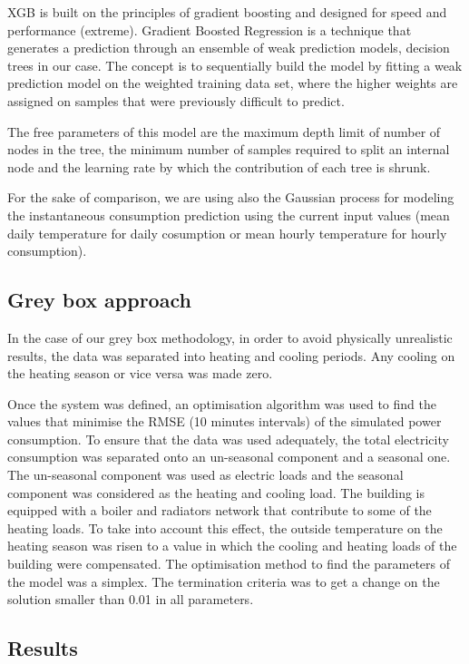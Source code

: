 \documentclass[10pt, conference, compsocconf]{IEEEtran}
\begin{document}
XGB is built on the principles of gradient boosting and designed for speed and performance (extreme).
Gradient Boosted Regression is a technique that generates a prediction through an ensemble of weak prediction models, decision trees in our case. The concept is to sequentially build the model by fitting a weak prediction model on the weighted training data set, where the higher weights are assigned on samples that were previously difficult to predict.

The free parameters of this model are the maximum depth limit of number of nodes in the tree, the minimum number of samples required to split an internal node and the learning rate by which the contribution of each tree is shrunk.

For the sake of comparison, we are using also the Gaussian process for modeling the instantaneous consumption prediction using the current input values (mean daily temperature for daily cosumption or mean hourly temperature for hourly consumption).


\subsection{Grey box approach}

In the case of our grey box methodology, in order to avoid physically unrealistic results, the data was separated into heating and cooling periods. Any cooling on the heating season or vice versa was made zero.

Once the system was defined, an optimisation algorithm was used to find the values that minimise the RMSE (10 minutes intervals) of the simulated power consumption. To ensure that the data was used adequately, the total electricity consumption was separated onto an un-seasonal component and a seasonal one. The un-seasonal component was used as electric loads and the seasonal component was considered as the heating and cooling load. The building is equipped with a boiler and radiators network that contribute to some of the heating loads. To take into account this effect, the outside temperature on the heating season was risen to a value in which the cooling and heating loads of the building were compensated.
The optimisation method to find the parameters of the model was a simplex. The termination criteria was to get a change on the solution smaller than 0.01 in all parameters. %

\subsection{Results}
\end{document}
